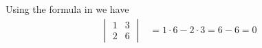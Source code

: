 Using the formula in  we have
%
\begin{align*}
\begin{vmatrix}1 & 3 \\ 2 & 6 \end{vmatrix} 
&= 1 \cdot 6 - 2 \cdot 3 = 6 - 6 = 0
\end{align*}
%